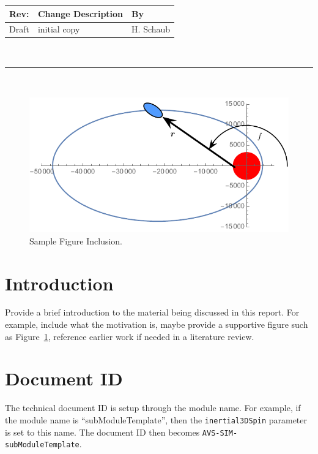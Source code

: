\documentclass[]{AVSSimReportMemo}
\newcommand{\ModuleName}{inertial3DSpin}
\begin{document}
\makeCover


%
%
\pagestyle{empty}
{\renewcommand{\arraystretch}{2}
\noindent
\begin{longtable}{|p{0.5in}|p{4.5in}|p{1.14in}|}
\hline
{\bfseries Rev}: & {\bfseries Change Description} & {\bfseries By} \\
\hline
Draft & initial copy & H. Schaub \\
\hline

\end{longtable}
}

\newpage
\setcounter{page}{1}
\pagestyle{fancy}

\tableofcontents
~\\ \hrule ~\\

\begin{figure}[htb]
	\centerline{
	\includegraphics[]{Figures/Fig1}
	}
	\caption{Sample Figure Inclusion.}
	\label{fig:Fig1}
\end{figure}

\section{Introduction}
Provide a brief introduction to the material being discussed in this report.  For example, include what the motivation is, maybe provide a supportive figure such as Figure~\ref{fig:Fig1}, reference earlier work if needed in a literature review.


\section{Document ID}
The technical document ID is setup through the module name.  For example, if the module name is ``subModuleTemplate'', then the  {\tt \ModuleName} parameter is set to this name.  The document ID then becomes {\tt AVS-SIM-subModuleTemplate}.  
\end{document}
